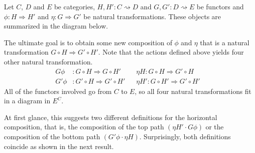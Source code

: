 \documentclass{article}
\theoremstyle{definition}
\theoremstyle{remark}
\begin{document}
Let $C$, $D$ and $E$ be categories, $H,H': C\rightsquigarrow D$ and $G,G':D \rightsquigarrow E$ be functors and $\phi:H\Rightarrow H'$ and $\eta:G\Rightarrow G'$ be natural transformations. These objects are summarized in the diagram below.
\begin{figure}[h]
	\centering
\end{figure}

The ultimate goal is to obtain some new composition of $\phi$ and $\eta$ that is a natural transformation $G\circ H \Rightarrow G'\circ H'$. Note that the actions defined above yields four other natural transformation.
\begin{align*}
	G\phi&: G\circ H \Rightarrow G\circ H' &&\eta H: G\circ H \Rightarrow G'\circ H \\
	G'\phi&: G'\circ H \Rightarrow G'\circ H'&&\eta H': G\circ H' \Rightarrow G'\circ H'
\end{align*}
All of the functors involved go from $C$ to $E$, so all four natural transformations fit in a diagram in $E^C$.
\begin{figure}[h]
	\centering
\end{figure}

At first glance, this suggests two different definitions for the horizontal composition, that is, the composition of the top path $(\eta H' \cdot G\phi)$ or the composition of the bottom path $(G'\phi \cdot \eta H)$. Surprisingly, both definitions coincide as shown in the next result.
\end{document}
